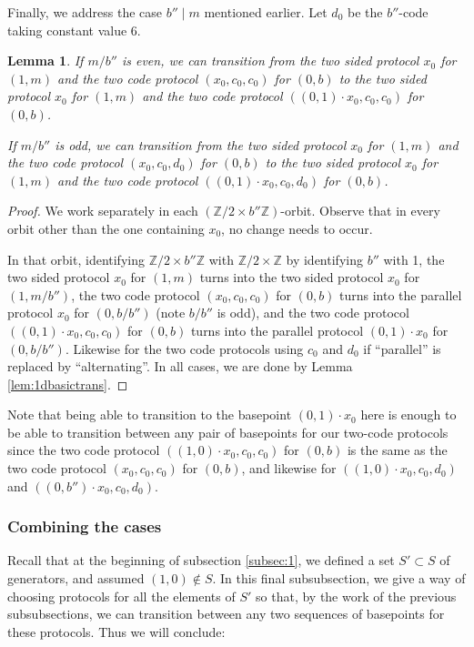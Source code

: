 \documentclass[10pt,a4paper]{article}
\newcommand{\0}{\varnothing}
\newcommand{\Z}{\mathbb{Z}}
\newtheorem{lemma}{Lemma}
\begin{document}
Finally, we address the case $b'' \mid m$ mentioned earlier. Let $d_0$ be the $b''$-code taking constant value 6.

\begin{lemma}\label{lem:specialeventrans}
If $m/b''$ is even, we can transition from the two sided protocol $x_0$ for $(1,m)$ and the two code protocol $(x_0,c_0,c_0)$ for $(0,b)$ to the two sided protocol $x_0$ for $(1,m)$ and the two code protocol $((0,1) \cdot x_0,c_0,c_0)$ for $(0,b)$.

If $m/b''$ is odd, we can transition from the two sided protocol $x_0$ for $(1,m)$ and the two code protocol $(x_0,c_0,d_0)$ for $(0,b)$ to the two sided protocol $x_0$ for $(1,m)$ and the two code protocol $((0,1) \cdot x_0,c_0,d_0)$ for $(0,b)$.
\end{lemma}

\begin{proof}
We work separately in each $(\Z/2 \times b''\Z)$-orbit. Observe that in every orbit other than the one containing $x_0$, no change needs to occur.

In that orbit, identifying $\Z/2 \times b''\Z$ with $\Z/2 \times \Z$ by identifying $b''$ with 1, the two sided protocol $x_0$ for $(1,m)$ turns into the two sided protocol $x_0$ for $(1,m/b'')$, the two code protocol $(x_0,c_0,c_0)$ for $(0,b)$ turns into the parallel protocol $x_0$ for $(0,b/b'')$ (note $b/b''$ is odd), and the two code protocol $((0,1) \cdot x_0,c_0,c_0)$ for $(0,b)$ turns into the parallel protocol $(0,1) \cdot x_0$ for $(0,b/b'')$. Likewise for the two code protocols using $c_0$ and $d_0$ if ``parallel'' is replaced by ``alternating''. In all cases, we are done by Lemma \ref{lem:1dbasictrans}.
\end{proof}

Note that being able to transition to the basepoint $(0,1) \cdot x_0$ here is enough to be able to transition between any pair of basepoints for our two-code protocols since the two code protocol $((1,0) \cdot x_0, c_0,c_0)$ for $(0,b)$ is the same as the two code protocol $(x_0,c_0,c_0)$ for $(0,b)$, and likewise for $((1,0) \cdot x_0,c_0,d_0)$ and $((0,b'') \cdot x_0,c_0,d_0)$.

\subsubsection{Combining the cases}

Recall that at the beginning of subsection \ref{subsec:1}, we defined a set $S' \subset S$ of generators, and assumed $(1,0) \not\in S$. In this final subsubsection, we give a way of choosing protocols for all the elements of $S'$ so that, by the work of the previous subsubsections, we can transition between any two sequences of basepoints for these protocols. Thus we will conclude:
\end{document}
